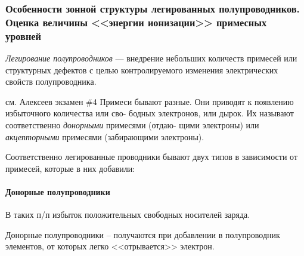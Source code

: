 \subsubsection{Особенности зонной структуры легированных полупроводников. Оценка величины <<энергии ионизации>> примесных уровней}

\textit{Легирование полупроводников} — внедрение небольших количеств примесей или структурных дефектов с целью контролируемого изменения электрических свойств полупроводника.

см. Алексеев экзамен \#4
Примеси бывают разные. Они приводят к появлению избыточного количества или сво-
бодных электронов, или дырок. Их называют соответственно \textit{донорными} примесями (отдаю-
щими электроны) или \textit{акцепторными} примесями (забирающими электроны).

Соответственно легированные проводники бывают двух типов в зависимости от примесей, которые в них добавили:
\paragraph{Донорные полупроводники} 
В таких п/п избыток положительных свободных носителей заряда.

Донорные полупроводники -- получаются при добавлении в полупроводник элементов, от которых легко <<отрывается>> электрон.


